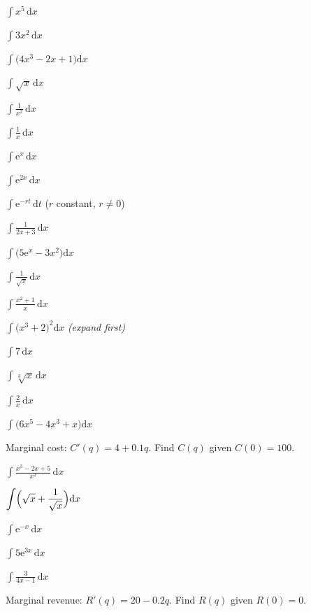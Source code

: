 \begin{problems}
  \item $\displaystyle\int x^{5}\,\mathrm{d}x$
  \item $\displaystyle\int 3x^{2}\,\mathrm{d}x$
  \item $\displaystyle\int \bigl(4x^{3}-2x+1\bigr)\mathrm{d}x$
  \item $\displaystyle\int \sqrt{x}\,\mathrm{d}x$
  \item $\displaystyle\int \frac{1}{x^{2}}\,\mathrm{d}x$
  \item $\displaystyle\int \frac{1}{x}\,\mathrm{d}x$
  \item $\displaystyle\int \mathrm{e}^{x}\,\mathrm{d}x$
  \item $\displaystyle\int \mathrm{e}^{2x}\,\mathrm{d}x$
  \item $\displaystyle\int \mathrm{e}^{-rt}\,\mathrm{d}t$
        \quad ($r$ constant, $r\neq 0$)
  \item $\displaystyle\int \frac{1}{2x+3}\,\mathrm{d}x$
  \item $\displaystyle\int \bigl(5\mathrm{e}^{x}-3x^{2}\bigr)\mathrm{d}x$
  \item $\displaystyle\int \frac{1}{\sqrt{x}}\,\mathrm{d}x$
  \item $\displaystyle\int \frac{x^{2}+1}{x}\,\mathrm{d}x$
  \item $\displaystyle\int \bigl(x^{3}+2\bigr)^{2}\mathrm{d}x$
        \quad \emph{(expand first)}
  \item $\displaystyle\int 7\,\mathrm{d}x$
  \item $\displaystyle\int \sqrt[3]{x}\,\mathrm{d}x$
  \item $\displaystyle\int \frac{2}{x}\,\mathrm{d}x$
  \item $\displaystyle\int \bigl(6x^{5}-4x^{3}+x\bigr)\mathrm{d}x$
  \item Marginal cost: $C'(q)=4+0.1q$. Find $C(q)$ given $C(0)=100$.
  \item $\displaystyle\int \frac{x^{3}-2x+5}{x^{2}}\,\mathrm{d}x$
  \item $\displaystyle\int \Bigl(\sqrt{x}+\frac{1}{\sqrt{x}}\Bigr)\mathrm{d}x$
  \item $\displaystyle\int \mathrm{e}^{-x}\,\mathrm{d}x$
  \item $\displaystyle\int 5\mathrm{e}^{3x}\,\mathrm{d}x$
  \item $\displaystyle\int \frac{3}{4x-1}\,\mathrm{d}x$
  \item Marginal revenue: $R'(q)=20-0.2q$. Find $R(q)$ given $R(0)=0$.
\end{problems}

